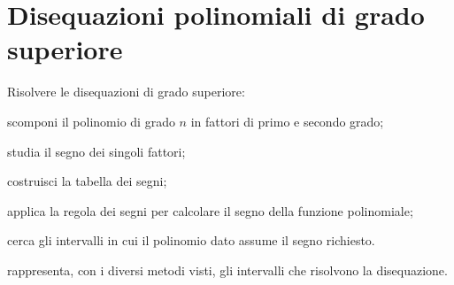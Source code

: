 %  
% 
% 

\section{Disequazioni polinomiali di grado superiore}
\label{sec:diseq_grado_superiore}

\begin{procedura}
Risolvere le disequazioni di grado superiore:
\begin{enumeratea}
\item scomponi il polinomio di grado \(n\) in fattori di primo e secondo 
grado;
\item studia il segno dei singoli fattori;
\item costruisci la tabella dei segni;
\item applica la regola dei segni per calcolare il segno della funzione 
polinomiale;
\item cerca gli intervalli in cui il polinomio dato assume il segno 
richiesto.
\item rappresenta, con i diversi metodi visti, gli intervalli che 
 risolvono la disequazione.
\end{enumeratea}
\end{procedura}

